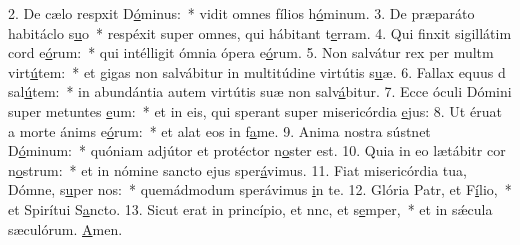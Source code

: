 2. De cælo respxit D\uline{ó}minus:~* vidit omnes fílios h\uline{ó}minum.
3. De præparáto habitáclo s\uline{u}o~* respéxit super omnes, qui hábitant t\uline{e}rram.
4. Qui finxit sigillátim cord e\uline{ó}rum:~* qui intélligit ómnia ópera e\uline{ó}rum.
5. Non salvátur rex per multm virt\uline{ú}tem:~* et gigas non salvábitur in multitúdine virtútis s\uline{u}æ.
6. Fallax equus d sal\uline{ú}tem:~* in abundántia autem virtútis suæ non salv\uline{á}bitur.
7. Ecce óculi Dómini super metuntes \uline{e}um:~* et in eis, qui sperant super misericórdia \uline{e}jus:
8. Ut éruat a morte ánims e\uline{ó}rum:~* et alat eos in f\uline{a}me.
9. Anima nostra sústnet D\uline{ó}minum:~* quóniam adjútor et protéctor n\uline{o}ster est.
10. Quia in eo lætábitr cor n\uline{o}strum:~* et in nómine sancto ejus sper\uline{á}vimus.
11. Fiat misericórdia tua, Dómne, s\uline{u}per nos:~* quemádmodum sperávimus \uline{i}n te.
12. Glória Patr, et F\uline{í}lio,~* et Spirítui S\uline{a}ncto.
13. Sicut erat in princípio, et nnc, et s\uline{e}mper,~* et in sǽcula sæculórum. \uline{A}men.
